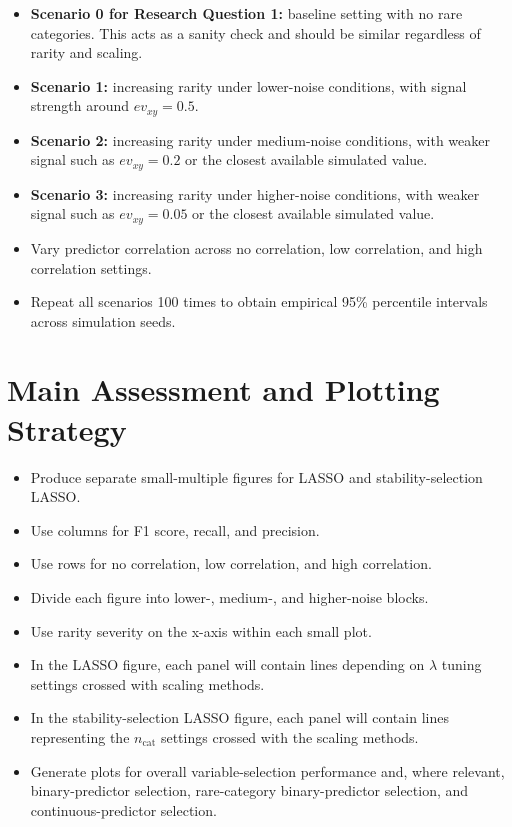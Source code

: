 \documentclass[12pt,a4paper,twoside]{report}
\begin{document}
\begin{itemize}
  \item \textbf{Scenario 0 for Research Question 1:} baseline setting with no rare categories. This acts as a sanity check and should be similar regardless of rarity and scaling.
  \item \textbf{Scenario 1:} increasing rarity under lower-noise conditions, with signal strength around $ev_{xy} = 0.5$.
  \item \textbf{Scenario 2:} increasing rarity under medium-noise conditions, with weaker signal such as $ev_{xy} = 0.2$ or the closest available simulated value.
  \item \textbf{Scenario 3:} increasing rarity under higher-noise conditions, with weaker signal such as $ev_{xy} = 0.05$ or the closest available simulated value.
  \item Vary predictor correlation across no correlation, low correlation, and high correlation settings.
  \item Repeat all scenarios 100 times to obtain empirical 95\% percentile intervals across simulation seeds.
\end{itemize}

\section{Main Assessment and Plotting Strategy}

\begin{itemize}
  \item Produce separate small-multiple figures for LASSO and stability-selection LASSO.
  \item Use columns for F1 score, recall, and precision.
  \item Use rows for no correlation, low correlation, and high correlation.
  \item Divide each figure into lower-, medium-, and higher-noise blocks.
  \item Use rarity severity on the x-axis within each small plot.
  \item In the LASSO figure, each panel will contain lines depending on $\lambda$ tuning settings crossed with scaling methods.
  \item In the stability-selection LASSO figure, each panel will contain lines representing the $n_{\mathrm{cat}}$ settings crossed with the scaling methods.
  \item Generate plots for overall variable-selection performance and, where relevant, binary-predictor selection, rare-category binary-predictor selection, and continuous-predictor selection.
\end{itemize}
\end{document}
